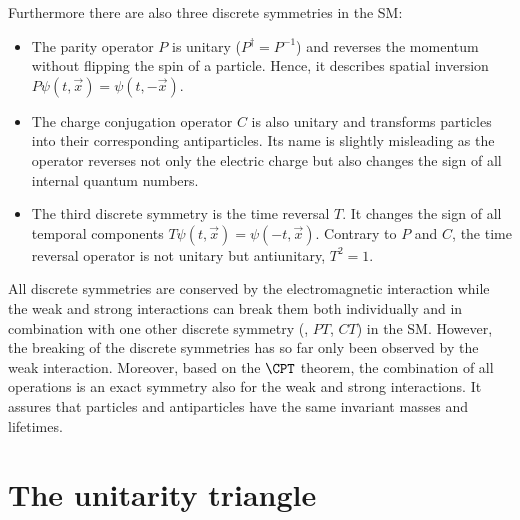 Furthermore there are also three discrete symmetries in the \ac{SM}:
\begin{itemize}
	\item The parity operator $P$ is unitary ($P^{\dagger}=P^{-1}$) and reverses the momentum without flipping the spin of a particle.
		Hence, it describes spatial inversion $P\psi\left(t,\vec{x}\right) = \psi\left(t,-\vec{x}\right)$.
	\item The charge conjugation operator $C$ is also unitary and transforms particles into their corresponding antiparticles.
		Its name is slightly misleading as the operator reverses not only the electric charge but also changes the sign of all internal quantum numbers.
	\item The third discrete symmetry is the time reversal $T$.
		It changes the sign of all temporal components $T\psi\left(t,\vec{x}\right) = \psi\left(-t,\vec{x}\right)$.
		Contrary to $P$ and $C$, the time reversal operator is not unitary but antiunitary, \ie $T^2=1$.
\end{itemize}
All discrete symmetries are conserved by the electromagnetic interaction while the weak and strong interactions can break them both
individually and in combination with one other discrete symmetry (\CP, $PT$, $CT$) in the \ac{SM}.
However, the breaking of the discrete symmetries has so far only been observed by the weak interaction.
Moreover, based on the $\CPT$ theorem, the combination of all operations is an exact symmetry also for the weak and strong interactions.
It assures that particles and antiparticles have the same invariant masses and lifetimes.

\section{The unitarity triangle}
\label{sec:unitarityTriangle}

